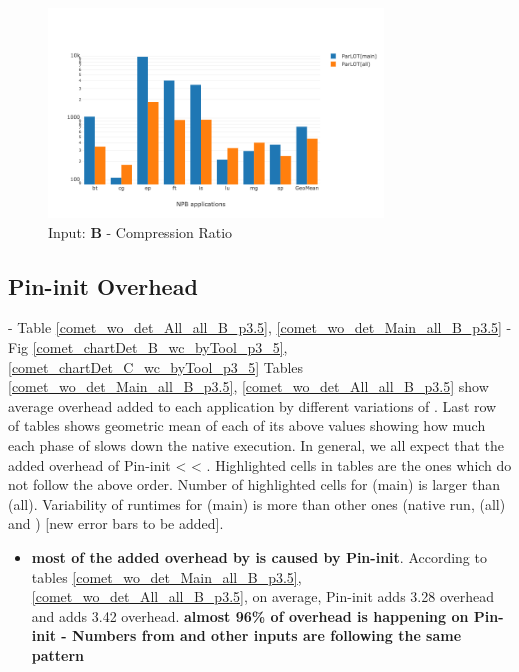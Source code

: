 \begin{figure}[!t]
\centering
\includegraphics[width=3.5in]{figs.comet/comet_chartAvg_cr_B_p3_5.png}
\caption{ Input: \textbf{B}  - Compression Ratio
}
\label{comet_chartAvg_cr_B_p3_5}
\end{figure}
  
  
\subsection{Pin-init Overhead} 
\label{subsec:pinit}
 - Table \ref{comet_wo_det_All_all_B_p3.5}, \ref{comet_wo_det_Main_all_B_p3.5}
  - Fig \ref{comet_chartDet_B_wc_byTool_p3_5}, \ref{comet_chartDet_C_wc_byTool_p3_5}
   Tables \ref{comet_wo_det_Main_all_B_p3.5}, \ref{comet_wo_det_All_all_B_p3.5} show average overhead added to each application by different variations of \parlot. Last row of tables shows geometric mean of each of its above values showing how much each phase of \parlot slows down the native execution. In general, we all expect that the added overhead of  Pin-init < \parlot < \parlotnc. Highlighted cells in tables are the ones which do not follow the above order. Number of highlighted cells for \parlot(main) is larger than \parlot(all). Variability of runtimes for \parlot(main) is more than other ones (native run, \parlot(all) and \callgrind) [new error bars to be added].
	
	\begin{itemize}
	\item \textbf{most of the added overhead by \parlot is caused by Pin-init}. According to tables \ref{comet_wo_det_Main_all_B_p3.5}, \ref{comet_wo_det_All_all_B_p3.5}, on average, Pin-init adds 3.28 overhead and \parlota adds 3.42 overhead. \textbf{almost 96\% of \parlota overhead is happening on Pin-init - Numbers from \parlotm and other inputs are following the same pattern}
	\end{itemize}


